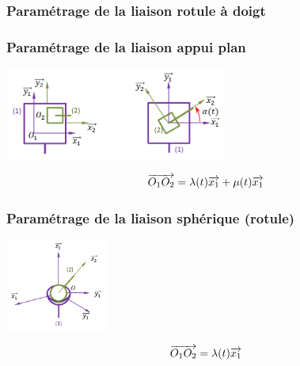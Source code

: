 \documentclass[10pt,oneside]{article}
\begin{document}
\subsubsection{Paramétrage de la liaison rotule à doigt}
\begin{minipage}[c]{.3\linewidth}
\begin{center}
\end{center}
\end{minipage} \hfill
\begin{minipage}[c]{.65\linewidth}

\end{minipage}

\subsubsection{Paramétrage de la liaison appui plan}
\begin{minipage}[c]{.3\linewidth}
\begin{center}
\includegraphics[height=3cm]{png/plan_p}
\end{center}
\end{minipage} \hfill
\begin{minipage}[c]{.65\linewidth}
$$
\overrightarrow{O_1 O_2} = \lambda(t) \overrightarrow{x_1} + \mu(t) \overrightarrow{x_1}
$$
\end{minipage}

\subsubsection{Paramétrage de la liaison sphérique (rotule)}
\begin{minipage}[c]{.3\linewidth}
\begin{center}
\includegraphics[height=3cm]{png/rotule_3d}
\end{center}
\end{minipage} \hfill
\begin{minipage}[c]{.65\linewidth}
$$
\overrightarrow{O_1 O_2} = \lambda(t) \overrightarrow{x_1}
$$
\end{minipage}
\end{document}
